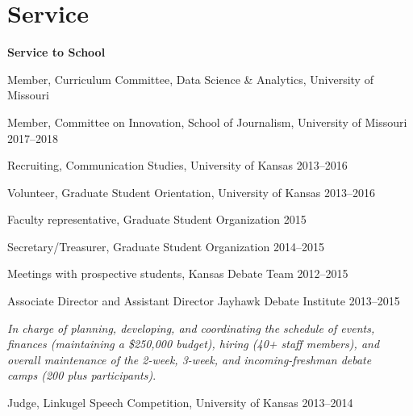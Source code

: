 \section{Service}

\textbf{Service to School}
  \begin{innerlist}
    \item Member, Curriculum Committee, Data Science \& Analytics, University of Missouri
    \item Member, Committee on Innovation, School of Journalism, University of Missouri \hfill 2017--2018
    \item Recruiting, Communication Studies, University of Kansas \hfill 2013--2016
    \item Volunteer, Graduate Student Orientation, University of Kansas \hfill 2013--2016
    \item Faculty representative, Graduate Student Organization \hfill 2015
    \item Secretary/Treasurer, Graduate Student Organization \hfill 2014--2015
    \item Meetings with prospective students, Kansas Debate Team \hfill 2012--2015
    \item Associate Director and Assistant Director Jayhawk Debate Institute \hfill 2013--2015
    \begin{outerlist}
      \item[]\textit{In charge of planning, developing, and coordinating the schedule of events,\\
        finances (maintaining a \$250,000 budget), hiring (40+ staff members), and\\
        overall maintenance of the 2-week, 3-week, and incoming-freshman debate \\
        camps (200 plus participants)}.
    \end{outerlist} \vspace{1em}
    \item Judge, Linkugel Speech Competition, University of Kansas \hfill 2013--2014
    \end{innerlist}\vspace{1em}

